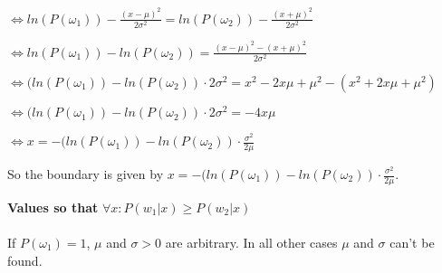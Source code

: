 \documentclass{article}
\begin{document}
\begin{description}
\begin{description}
\vspace{0.3cm} 
$\Leftrightarrow  ln(P(\omega_1)) - \frac{(x-\mu)^2}{2\sigma^2} = ln(P(\omega_2)) - \frac{(x+\mu)^2}{2\sigma^2}$

\vspace{0.3cm} 
$\Leftrightarrow ln(P(\omega_1)) - ln(P(\omega_2)) = \frac{(x-\mu)^2 - (x+\mu)^2}{2\sigma^2}$

\vspace{0.3cm} 
$\Leftrightarrow (ln(P(\omega_1)) - ln(P(\omega_2)) \cdot 2\sigma^2 = x^2 - 2x\mu + \mu^2 - (x^2 + 2x\mu + \mu^2)$

\vspace{0.3cm} 
$\Leftrightarrow (ln(P(\omega_1)) - ln(P(\omega_2)) \cdot 2\sigma^2 = -4x\mu$

\vspace{0.3cm} 
$\Leftrightarrow x = -(ln(P(\omega_1)) - ln(P(\omega_2)) \cdot \frac{\sigma^2}{2\mu} $

So the boundary is given by $x = -(ln(P(\omega_1)) - ln(P(\omega_2)) \cdot \frac{\sigma^2}{2\mu}$.\\
\item \textbf{Values so that }$\forall x : P(w_1|x) \geq P(w_2|x)$\\
\\
If $P(\omega_1) = 1$, $\mu$ and $\sigma > 0$  are arbitrary. In all other cases $\mu$ and $\sigma$ can't be found.\\
\end{description}

\end{description}
\end{document}
